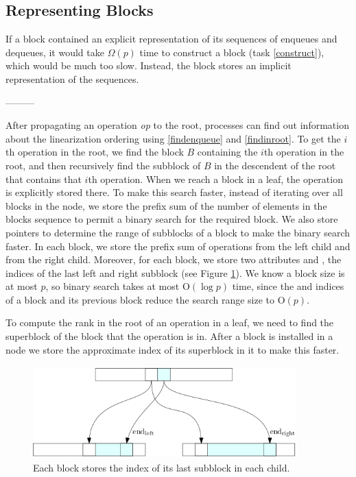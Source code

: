 \subsection{Representing Blocks}

If a block contained an explicit representation of its sequences of enqueues and dequeues,
it would take $\Omega(p)$ time to construct a block (task \ref{construct}), which would be much too slow.
Instead, the block stores an implicit representation of the sequences.



---------


After propagating an operation \textit{op} to the root, processes can
find out information about the linearization ordering using \ref{findenqueue} and
\ref{findinroot}.  
To get the $i$th operation in the root, we find the block $B$
containing the $i$th operation in the root, and then recursively find
the subblock of $B$ in the descendent of the root that contains that
$i$th operation. When we reach a block in a leaf, the operation is
explicitly stored there. To make this search faster, instead of
iterating over all blocks in the node, we store the prefix sum of the
number of elements in the blocks sequence to permit a binary search
for the required block. We also store pointers to determine the range
of subblocks of a block to make the binary search faster. In each
block, we store the prefix sum of operations from the left child and
from the right child. Moreover, for each block, we store two
attributes  and , the indices of
the last left and right subblock (see Figure \ref{fig::pointer}). We
know a block size is at most $p$, so binary search takes at most
\textsc{O}$(\log p)$ time, since the  and
 indices of a block and its previous block reduce
the search range size to \textsc{O}$(p)$. 

To compute the rank in the root of an operation in a leaf, we need to
find the superblock of the block that the operation is in. After a
block is installed in a node we store the approximate index of its
superblock in it to make this faster. 

\begin{figure}[hbtp]
\centering
  \includegraphics[width=4in, height=1.4in]{pics/pointers}
  \caption{Each block stores the index of its last subblock in each
    child. \label{fig::pointer}} 
\end{figure}

